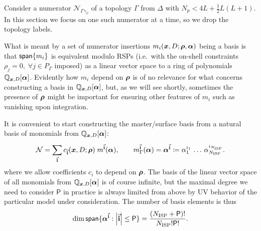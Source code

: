 Consider a numerator $\mathcal{N}_{\Gamma\gamma_\Gamma}$ of a topology $\Gamma$ from $\Delta$ with $N_p <  4L + \frac{1}{2}L(L+1)$.
In this section we focus on one such numerator at a time, so we drop the topology labels.

What is meant by a set of numerator insertions $m_{i}(\vb*{x},D;\vb*{\rho},\vb*{\alpha})$ being a basis is that
$\mathsf{span}\{m_{i}\}$ is equivalent
modulo RSPs (i.e.\ with the on-shell constraints $\rho_j = 0,\;\forall j\in P_\Gamma$ imposed)
as a linear vector space to a ring of polynomials $\mathbb{Q}_{\vb*{x},D}[\vb*{\alpha}]$.
Evidently how $m_{i}$ depend on $\vb*{\rho}$ is of no relevance for what concerns constructing
a basis in $\mathbb{Q}_{\vb*{x},D}[\vb*{\alpha}]$, but, as we will see shortly, sometimes the presence
of $\vb*{\rho}$ might be important for ensuring other features of $m_{i}$ such as vanishing
upon integration.


It is convenient to start constructing the master/surface basis from a natural basis of monomials from $\mathbb{Q}_{\vb*{x},D}[\vb*{\alpha}]$:
\begin{equation}
  \mathcal{N} = \sum_{\va{i}}^{} c_{\va{i}}(\vb*{x},D;\vb*{\rho}) \; m^{\va{i}}(\vb*{\alpha}), \qquad
  m_\Gamma^{\va{i}}(\vb*{\alpha}) = \vb*{\alpha}^{\va{i}} \coloneqq 
  \alpha_1^{i_1}\,\ldots{}\,\alpha_{N_\text{ISP} }^{i_{N_\text{ISP} }}.
\end{equation}
where we allow coefficients $c_{i}$ to depend on $\vb*{\rho}$.
The basis of the linear vector space of all monomials from $\mathbb{Q}_{\vb*{x},D}[\vb*{\alpha}]$ is of course infinite,
but the maximal degree  we need to consider $\mathsf{P}$ in practice is always limited from above by UV behavior of the particular model under consideration.
The number of basis elements is thus 
\begin{equation} \label{eq:number_of_monomials}
  \dim{\mathsf{span}\{\vb*{\alpha}^{\va{i}} : \abs{\va{i}} \leq  \mathsf{P}\}} =  \frac{(N_\text{ISP} + \mathsf{P})!}{N_\text{ISP}! \mathsf{P}!}.
\end{equation}

